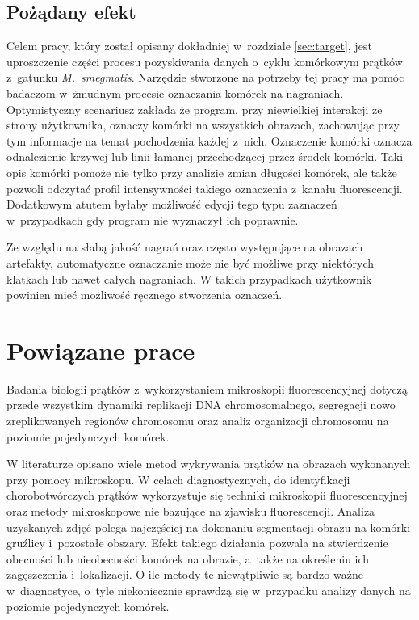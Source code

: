 \documentclass[declaration,shortabstract,mgr]{iithesis}
\begin{document}
\subsection{Pożądany efekt}

Celem pracy, który został opisany dokładniej w~rozdziale \ref{sec:target}, jest uproszczenie części procesu pozyskiwania danych o~cyklu komórkowym prątków z~gatunku \emph{M.~smegmatis}.
Narzędzie stworzone na potrzeby tej pracy ma pomóc badaczom w~żmudnym procesie oznaczania komórek na nagraniach.
Optymistyczny scenariusz zakłada że program, przy niewielkiej interakcji ze strony użytkownika, oznaczy komórki na wszystkich obrazach, zachowując przy tym informacje na temat pochodzenia każdej z~nich.
Oznaczenie komórki oznacza odnalezienie krzywej lub linii łamanej przechodzącej przez środek komórki.
Taki opis komórki pomoże nie tylko przy analizie zmian długości komórek, ale także pozwoli odczytać profil intensywności takiego oznaczenia z~kanału fluorescencji.
Dodatkowym atutem byłaby możliwość edycji tego typu zaznaczeń w~przypadkach gdy program nie wyznaczył ich poprawnie.

Ze względu na słabą jakość nagrań oraz często występujące na obrazach artefakty, automatyczne oznaczanie może nie być możliwe przy niektórych klatkach lub nawet całych nagraniach.
W takich przypadkach użytkownik powinien mieć możliwość ręcznego stworzenia oznaczeń.

\section{Powiązane prace}

Badania biologii prątków z~wykorzystaniem mikroskopii fluorescencyjnej dotyczą przede wszystkim dynamiki replikacji DNA chromosomalnego, segregacji nowo zreplikowanych regionów chromosomu oraz analiz organizacji chromosomu na poziomie pojedynczych komórek\cite{paper:watching-dna-replication}\cite{paper:protein-responsibility}.

W literaturze opisano wiele metod wykrywania prątków na obrazach wykonanych przy pomocy mikroskopu.
W celach diagnostycznych, do identyfikacji chorobotwórczych prątków wykorzystuje się techniki mikroskopii fluorescencyjnej\cite{paper:detection-of-tb-with-ip} oraz metody mikroskopowe nie bazujące na zjawisku fluorescencji\cite{paper:ip-techniques-for-identifying-tb}.
Analiza uzyskanych zdjęć polega najczęściej na dokonaniu segmentacji obrazu na komórki gruźlicy i~pozostałe obszary.
Efekt takiego działania pozwala na stwierdzenie obecności lub nieobecności komórek na obrazie, a~także na określeniu ich zagęszczenia i~lokalizacji.
O ile metody te niewątpliwie są bardzo ważne w~diagnostyce, o~tyle niekoniecznie sprawdzą się w~przypadku analizy danych na poziomie pojedynczych komórek.
\end{document}
